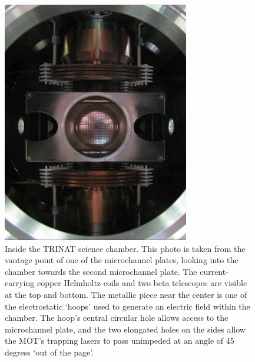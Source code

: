 \begin{figure}[h!!!tb]
	\centering
	\includegraphics[width=.80\linewidth]{Figures/chamber_photo_2.png}
	\caption{Inside the TRINAT science chamber.  This photo is taken from the vantage point of one of the microchannel plates, looking into the chamber towards the second microchannel plate.  The current-carrying copper Helmholtz coils and two beta telescopes are visible at the top and bottom.  The metallic piece near the center is one of the electrostatic `hoops' used to generate an electric field within the chamber.  The hoop's central circular hole allows access to the microchannel plate, and the two elongated holes on the sides allow the MOT's trapping lasers to pass unimpeded at an angle of 45 degress `out of the page'.}
	\label{fig:thechamber}
\end{figure}



%




